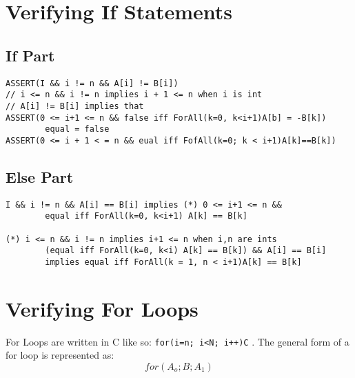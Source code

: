 \documentclass[12pt]{book}
\title{\coursetitle\linebreak\lecturename}
\author{\\Cain Susko\\ 
           \\ \\ \\
      Queen's University 
    \\School of Computing\\}
\begin{document}
\begin{titlepage}
        \maketitle
\end{titlepage}


\section*{Verifying If Statements}
\subsection*{If Part}
\begin{verbatim}
ASSERT(I && i != n && A[i] != B[i])
// i <= n && i != n implies i + 1 <= n when i is int
// A[i] != B[i] implies that 
ASSERT(0 <= i+1 <= n && false iff ForAll(k=0, k<i+1)A[b] = -B[k])
        equal = false
ASSERT(0 <= i + 1 < = n && eual iff FofAll(k=0; k < i+1)A[k]==B[k])
\end{verbatim}

\subsection*{Else Part}
\begin{verbatim}
I && i != n && A[i] == B[i] implies (*) 0 <= i+1 <= n && 
        equal iff ForAll(k=0, k<i+1) A[k] == B[k]

(*) i <= n && i != n implies i+1 <= n when i,n are ints 
        (equal iff ForAll(k=0, k<i) A[k] == B[k]) && A[i] == B[i] 
        implies equal iff ForAll(k = 1, n < i+1)A[k] == B[k]
\end{verbatim}

\section*{Verifying For Loops}
For Loops are written in C like so: \texttt{for(i=n; i<N; i++)C}
. The general form of a for loop is represented as:
\[for(A_o; B; A_1)\]
\end{document}
